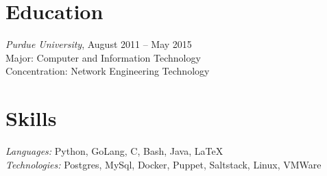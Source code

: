\documentclass[line,margin]{res}
\begin{document}
  \name{\textcolor{TealBlue}{Ethan Madden}}
  \address{ethan@madden.ninja -- (812) 250-1419}%
  \address{2049 NW 60th St, Seattle WA 98107}

\begin{resume}
  \section{\textcolor{TealBlue}{Education}} 
    {\sl Purdue University}, \hfill August 2011 -- May 2015 \\%
      Major: Computer and Information Technology \\
      Concentration: Network Engineering Technology

  \section{\textcolor{TealBlue}{Skills}} 
    {\sl Languages:\/}  Python, GoLang, C, Bash, Java, \LaTeX{} \\
    {\sl Technologies:\/} Postgres, MySql, Docker, Puppet, Saltstack, Linux, VMWare


\end{resume}
\end{document}
